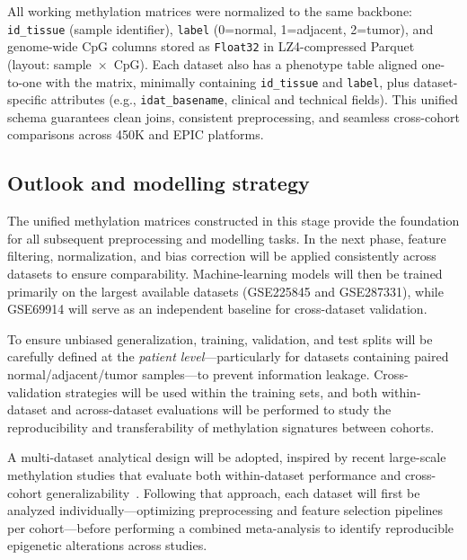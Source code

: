 \documentclass[10pt]{extarticle}
\begin{document}
All working methylation matrices were normalized to the same backbone:
\texttt{id\_tissue} (sample identifier), \texttt{label} (0=normal, 1=adjacent, 2=tumor), and genome-wide CpG columns stored as \texttt{Float32} in LZ4-compressed Parquet (layout: sample~$\times$~CpG).  
Each dataset also has a phenotype table aligned one-to-one with the matrix, minimally containing \texttt{id\_tissue} and \texttt{label}, plus dataset-specific attributes (e.g., \texttt{idat\_basename}, clinical and technical fields).  
This unified schema guarantees clean joins, consistent preprocessing, and seamless cross-cohort comparisons across 450K and EPIC platforms.


\subsection{Outlook and modelling strategy}

The unified methylation matrices constructed in this stage provide the foundation for all subsequent preprocessing and modelling tasks.  
In the next phase, feature filtering, normalization, and bias correction will be applied consistently across datasets to ensure comparability.  
Machine-learning models will then be trained primarily on the largest available datasets (GSE225845 and GSE287331), while GSE69914 will serve as an independent baseline for cross-dataset validation.

To ensure unbiased generalization, training, validation, and test splits will be carefully defined at the \emph{patient level}—particularly for datasets containing paired normal/adjacent/tumor samples—to prevent information leakage.  
Cross-validation strategies will be used within the training sets, and both within-dataset and across-dataset evaluations will be performed to study the reproducibility and transferability of methylation signatures between cohorts.  

A multi-dataset analytical design will be adopted, inspired by recent large-scale methylation studies that evaluate both within-dataset performance and cross-cohort generalizability~\cite{DecodingDepression2024}.  
Following that approach, each dataset will first be analyzed individually—optimizing preprocessing and feature selection pipelines per cohort—before performing a combined meta-analysis to identify reproducible epigenetic alterations across studies.


\printbibliography
\end{document}
